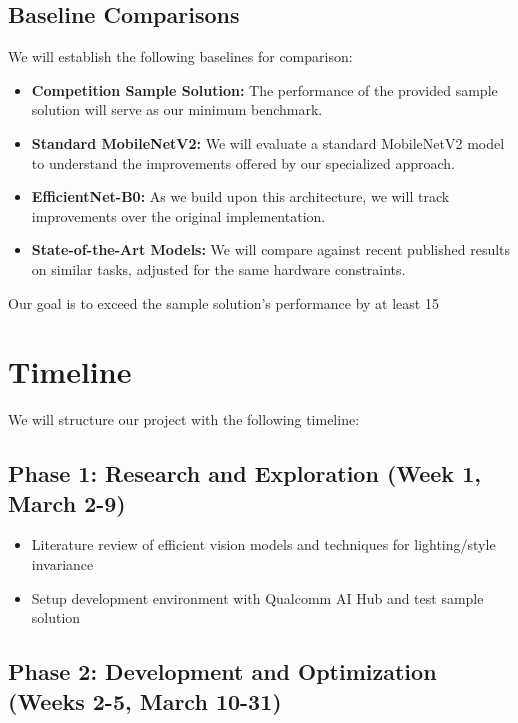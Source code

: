 \documentclass[11pt, oneside]{article}   	%
\begin{document}
\subsection*{Baseline Comparisons}

We will establish the following baselines for comparison:

\begin{itemize}
	\item \textbf{Competition Sample Solution:} The performance of the provided sample solution will serve as our minimum benchmark.

	\item \textbf{Standard MobileNetV2:} We will evaluate a standard MobileNetV2 model to understand the improvements offered by our specialized approach.

	\item \textbf{EfficientNet-B0:} As we build upon this architecture, we will track improvements over the original implementation.

	\item \textbf{State-of-the-Art Models:} We will compare against recent published results on similar tasks, adjusted for the same hardware constraints.
\end{itemize}

Our goal is to exceed the sample solution's performance by at least 15%

\section*{Timeline}

We will structure our project with the following timeline:

\subsection*{Phase 1: Research and Exploration (Week 1, March 2-9)}

\begin{itemize}
	\item Literature review of efficient vision models and techniques for lighting/style invariance
	\item Setup development environment with Qualcomm AI Hub and test sample solution
\end{itemize}

\subsection*{Phase 2: Development and Optimization (Weeks 2-5, March 10-31)}
\end{document}
